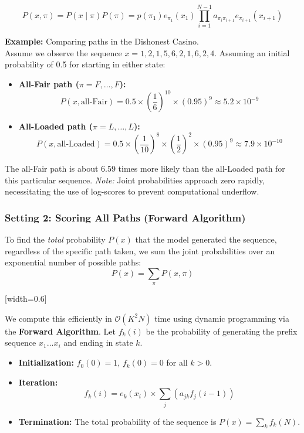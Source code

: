 \[ P(x, \pi) = P(x \mid \pi) P(\pi) = p(\pi_1) e_{\pi_1}(x_1) \prod_{i=1}^{N-1} a_{\pi_i \pi_{i+1}} e_{\pi_{i+1}}(x_{i+1}) \]

\textbf{Example:} Comparing paths in the Dishonest Casino.\\
Assume we observe the sequence \( x = 1, 2, 1, 5, 6, 2, 1, 6, 2, 4 \). Assuming an initial probability of 0.5 for starting in either state:
\begin{itemize}
    \item \textbf{All-Fair path (\(\pi = F, \dots, F\)):}
    \[ P(x, \text{all-Fair}) = 0.5 \times \left(\frac{1}{6}\right)^{10} \times (0.95)^9 \approx 5.2 \times 10^{-9} \]
    \item \textbf{All-Loaded path (\(\pi = L, \dots, L\)):}
    \[ P(x, \text{all-Loaded}) = 0.5 \times \left(\frac{1}{10}\right)^8 \times \left(\frac{1}{2}\right)^2 \times (0.95)^9 \approx 7.9 \times 10^{-10} \]
\end{itemize}
The all-Fair path is about 6.59 times more likely than the all-Loaded path for this particular sequence. 
\sta \textit{Note:} Joint probabilities approach zero rapidly, necessitating the use of log-scores to prevent computational underflow.


\subsubsection{Setting 2: Scoring All Paths (Forward Algorithm)}

To find the \textit{total} probability \( P(x) \) that the model generated the sequence, regardless of the specific path taken, we sum the joint probabilities over an exponential number of possible paths:
\[ P(x) = \sum_{\pi} P(x, \pi) \]

[width=0.6\textwidth]

We compute this efficiently in $\mathcal{O}(K^2 N)$ time using dynamic programming via the \textbf{Forward Algorithm}. Let \( f_k(i) \) be the probability of generating the prefix sequence \( x_1 \dots x_i \) and ending in state \( k \).

\begin{itemize}
    \item \textbf{Initialization:} \( f_0(0) = 1 \), \( f_k(0) = 0 \) for all \( k > 0 \).
    \item \textbf{Iteration:} 
    \[ f_k(i) = e_k(x_i) \times \sum_j \left( a_{jk} f_j(i-1) \right) \]
    \item \textbf{Termination:} The total probability of the sequence is \( P(x) = \sum_k f_k(N) \).
\end{itemize}

